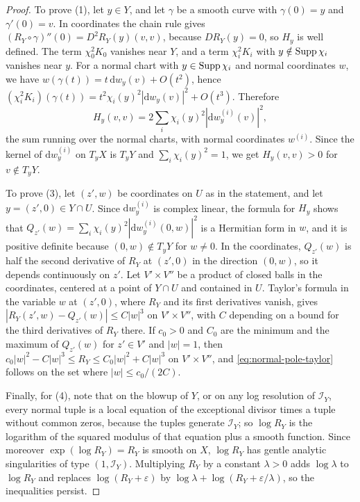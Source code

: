 \begin{proof}
To prove (1), let $y\in Y$, and let $\gamma$ be a smooth curve with $\gamma(0)=y$ and $\gamma'(0)=v$. In coordinates the chain rule gives $(R_Y\circ\gamma)''(0)=D^2R_Y(y)(v,v)$, because $DR_Y(y)=0$, so $H_y$ is well defined. The term $\chi_0^2K_0$ vanishes near $Y$, and a term $\chi_i^2K_i$ with $y\notin\operatorname{Supp}\chi_i$ vanishes near $y$. For a normal chart with $y\in\operatorname{Supp}\chi_i$ and normal coordinates $w$, we have $w(\gamma(t))=t\,\mathrm dw_y(v)+O(t^2)$, hence $(\chi_i^2K_i)(\gamma(t))=t^2\chi_i(y)^2|\mathrm dw_y(v)|^2+O(t^3)$. Therefore
\[
 H_y(v,v)=2\sum_i\chi_i(y)^2|\mathrm dw^{(i)}_y(v)|^2,
\]
the sum running over the normal charts, with normal coordinates $w^{(i)}$. Since the kernel of $\mathrm dw^{(i)}_y$ on $T_yX$ is $T_yY$ and $\sum_i\chi_i(y)^2=1$, we get $H_y(v,v)>0$ for $v\notin T_yY$.

To prove (3), let $(z',w)$ be coordinates on $U$ as in the statement, and let $y=(z',0)\in Y\cap U$. Since $\mathrm dw^{(i)}_y$ is complex linear, the formula for $H_y$ shows that $Q_{z'}(w)=\sum_i\chi_i(y)^2|\mathrm dw^{(i)}_y(0,w)|^2$ is a Hermitian form in $w$, and it is positive definite because $(0,w)\notin T_yY$ for $w\neq0$. In the coordinates, $Q_{z'}(w)$ is half the second derivative of $R_Y$ at $(z',0)$ in the direction $(0,w)$, so it depends continuously on $z'$. Let $V'\times V''$ be a product of closed balls in the coordinates, centered at a point of $Y\cap U$ and contained in $U$. Taylor's formula in the variable $w$ at $(z',0)$, where $R_Y$ and its first derivatives vanish, gives $|R_Y(z',w)-Q_{z'}(w)|\leq C|w|^3$ on $V'\times V''$, with $C$ depending on a bound for the third derivatives of $R_Y$ there. If $c_0>0$ and $C_0$ are the minimum and the maximum of $Q_{z'}(w)$ for $z'\in V'$ and $|w|=1$, then $c_0|w|^2-C|w|^3\leq R_Y\leq C_0|w|^2+C|w|^3$ on $V'\times V''$, and \eqref{eq:normal-pole-taylor} follows on the set where $|w|\leq c_0/(2C)$.

Finally, for (4), note that on the blowup of $Y$, or on any log resolution of $\mathcal I_Y$, every normal tuple is a local equation of the exceptional divisor times a tuple without common zeros, because the tuples generate $\mathcal I_Y$; so $\log R_Y$ is the logarithm of the squared modulus of that equation plus a smooth function. Since moreover $\exp(\log R_Y)=R_Y$ is smooth on $X$, $\log R_Y$ has gentle analytic singularities of type $(1,\mathcal I_Y)$. Multiplying $R_Y$ by a constant $\lambda>0$ adds $\log\lambda$ to $\log R_Y$ and replaces $\log(R_Y+\varepsilon)$ by $\log\lambda+\log(R_Y+\varepsilon/\lambda)$, so the inequalities persist.
\end{proof}

